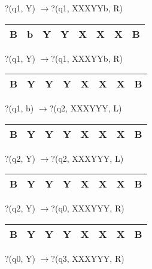\documentclass{article} %
\begin{document}
?(q1, Y) $\to $?(q1, XXXYYb, R)

\noindent 

\begin{tabular}{|p{0.2in}|p{0.2in}|p{0.2in}|p{0.2in}|p{0.2in}|p{0.2in}|p{0.2in}|p{0.2in}|} \hline 
B & b & Y & Y & X & X & X & B \\ \hline 
\end{tabular}

?(q1, Y) $\to $?(q1, XXXYYb, R)

\noindent 

\begin{tabular}{|p{0.2in}|p{0.2in}|p{0.2in}|p{0.2in}|p{0.2in}|p{0.2in}|p{0.2in}|p{0.2in}|} \hline 
B & Y & Y & Y & X & X & X & B \\ \hline 
\end{tabular}

?(q1, b) $\to $?(q2, XXXYYY, L)

\noindent 

\begin{tabular}{|p{0.2in}|p{0.2in}|p{0.2in}|p{0.2in}|p{0.2in}|p{0.2in}|p{0.2in}|p{0.2in}|} \hline 
B & Y & Y & Y & X & X & X & B \\ \hline 
\end{tabular}

?(q2, Y) $\to $?(q2, XXXYYY, L)

\noindent 

\begin{tabular}{|p{0.2in}|p{0.2in}|p{0.2in}|p{0.2in}|p{0.2in}|p{0.2in}|p{0.2in}|p{0.2in}|} \hline 
B & Y & Y & Y & X & X & X & B \\ \hline 
\end{tabular}

?(q2, Y) $\to $?(q0, XXXYYY, R)

\noindent 

\begin{tabular}{|p{0.2in}|p{0.2in}|p{0.2in}|p{0.2in}|p{0.2in}|p{0.2in}|p{0.2in}|p{0.2in}|} \hline 
B & Y & Y & Y & X & X & X & B \\ \hline 
\end{tabular}

?(q0, Y) $\to $?(q3, XXXYYY, R)

\noindent 

\noindent 

\noindent 

\noindent 

\noindent 

\noindent 

\noindent 
\end{document}
